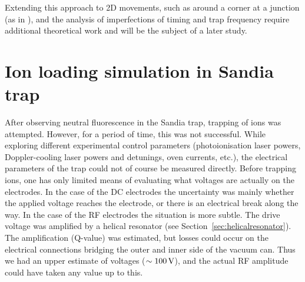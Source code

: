 

Extending this approach to 2D movements, such as around a corner at a junction (as in \cite{Hensinger2006}), and the analysis of imperfections of timing and trap frequency require additional theoretical work and will be the subject of a later study.


\section{Ion loading simulation in Sandia trap}

After observing neutral \CaI{} fluorescence in the Sandia trap, trapping of ions was attempted. However, for a period of time, this was not successful. While exploring different experimental control parameters (photoionisation laser powers, Doppler-cooling laser powers and detunings, \CaI{} oven currents, etc.), the electrical parameters of the trap could not of course be measured directly. Before trapping ions, one has only limited means of evaluating what voltages are actually on the electrodes. In the case of the DC electrodes the uncertainty was mainly whether the applied voltage reaches the electrode, or there is an electrical break along the way. In the case of the RF electrodes the situation is more subtle. The drive voltage was amplified by a helical resonator (see Section~\ref{sec:helicalresonator}). The amplification (Q-value) was estimated, but losses could occur on the electrical connections bridging the outer and inner side of the vacuum can. Thus we had an upper estimate of voltages ($\sim 100\,\mbox{V}$), and the actual RF amplitude could have taken any value up to this.

